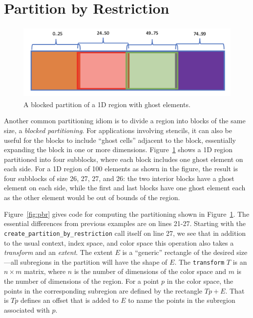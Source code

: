 \section{Partition by Restriction}
\label{sec:pbr}

\begin{figure}
  \includegraphics[height=1.5in]{figs/pbr.png}
  \caption{A blocked partition of a 1D region with ghost elements.}
  \label{fig:1dpbr}
\end{figure}

Another common partitioning idiom is to divide a region into blocks of the same size, a {\em blocked partitioning}.  For applications involving stencils, it can
also be useful for the blocks to include ``ghost cells'' adjacent to the block, essentially expanding the block in one or more dimensions.
Figure~\ref{fig:1dpbr} shows a 1D region partitioned into four subblocks, where each block includes one ghost element on each side.  For
a 1D region of 100 elements as shown in the figure, the result is four subblocks of size 26, 27, 27, and 26:  the two interior blocks have a ghost element on each side, while the first and last blocks have one ghost element each as the other element would be out of bounds of the region.

Figure~\ref{fig:pbr} gives code for computing the partitioning shown in Figure~\ref{fig:1dpbr}.  The essential differences from previous
  examples are on lines 21-27.  Starting with the {\tt create\_partition\_by\_restriction} call itself on line 27, we see that in addition to the
  usual context, index space, and color space this operation also takes a {\em transform} and an {\em extent}.  The extent $E$ is a ``generic''
  rectangle of the desired size---all subregions in the partition will have the shape of $E$.  The {\tt transform} $T$ is an
  $n \times m$ matrix, where $n$ is the number of dimensions of the color space and $m$ is the number of dimensions of the region.
  For a point $p$ in the color space, the points in the corresponding subregion are defined by the rectangle $Tp + E$.  That is $Tp$ defines
  an offset that is added to $E$ to name the points in the subregion associated with $p$.

